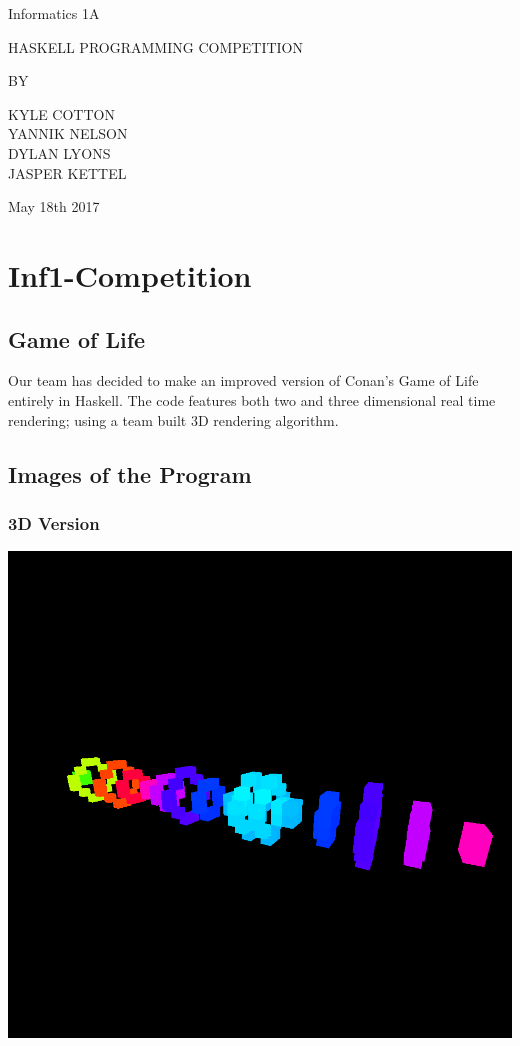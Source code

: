 \documentclass[11pt]{article}
\author{Kyle Cotton}
\date{\today}
\title{}
\begin{document}
\begin{titlepage}
\begin{center}
{\Large Informatics 1A \par}
\vspace{2cm}
{\Large HASKELL PROGRAMMING COMPETITION \par}
\vspace{2cm}
BY \par
\vspace{2cm}
{\Large KYLE COTTON\\YANNIK NELSON\\DYLAN LYONS\\JASPER KETTEL \par}
\vspace{2cm}
{\large May 18th 2017}
\end{center}
\vfill
\end{titlepage}

\tableofcontents

\section{Inf1-Competition}
\label{sec:orgc84694a}
\subsection{Game of Life}
\label{sec:org2b1e5bb}
Our team has decided to make an improved version of Conan's Game of Life entirely in Haskell.
The code features both two and three dimensional real time rendering; using a team built 3D rendering algorithm.

\subsection{Images of the Program}
\label{sec:org0ce0736}
\subsubsection{3D Version}
\label{sec:orga3a9844}

\begin{center}
\includegraphics[width=.9\linewidth]{img/1-3.png}
\end{center}
\end{document}

